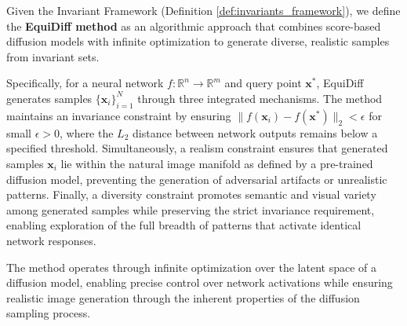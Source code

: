 \begin{defi}\label{def:equidiff_method}
Given the Invariant Framework (Definition \ref{def:invariants_framework}), we define the \textbf{EquiDiff method} as an algorithmic approach that combines score-based diffusion models with infinite optimization to generate diverse, realistic samples from invariant sets.

Specifically, for a neural network $f: \mathbb{R}^n \rightarrow \mathbb{R}^m$ and query point $\mathbf{x}^*$, EquiDiff generates samples $\{\mathbf{x}_i\}_{i=1}^N$ through three integrated mechanisms. The method maintains an invariance constraint by ensuring $\|f(\mathbf{x}_i) - f(\mathbf{x}^*)\|_2 < \epsilon$ for small $\epsilon > 0$, where the $L_2$ distance between network outputs remains below a specified threshold. Simultaneously, a realism constraint ensures that generated samples $\mathbf{x}_i$ lie within the natural image manifold as defined by a pre-trained diffusion model, preventing the generation of adversarial artifacts or unrealistic patterns. Finally, a diversity constraint promotes semantic and visual variety among generated samples while preserving the strict invariance requirement, enabling exploration of the full breadth of patterns that activate identical network responses.

The method operates through infinite optimization over the latent space of a diffusion model, enabling precise control over network activations while ensuring realistic image generation through the inherent properties of the diffusion sampling process.
\end{defi}

